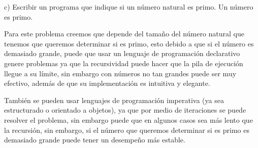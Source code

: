 \Large

c) Escribir un programa que indique si un número natural es primo. Un número es primo.\\
\newline
\large

Para este problema creemos que depende del tamaño del número natural que tenemos que queremos determinar si es primo,
esto debido a que si el número es demasiado grande, puede que usar un lenguaje de programación declarativo genere problemas ya que la recursividad puede hacer que la pila de ejecución llegue
a su límite, sin embargo con números no tan grandes puede ser muy efectivo, además de que su implementación es intuitiva
y elegante.

También se pueden usar lenguajes de programación imperativa (ya sea estructurado o orientado a objetos), ya que por medio
de iteraciones se puede resolver el problema, sin embargo puede que en algunos casos sea más lento que la recursión, sin embargo,
si el número que queremos determinar si es primo es demasiado grande puede tener un desempeño más estable.  